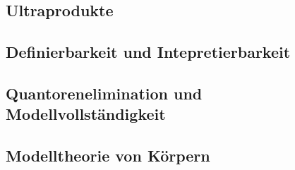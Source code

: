 \subsection{Ultraprodukte}

\subsection{Definierbarkeit und Intepretierbarkeit}

\subsection{Quantorenelimination und Modellvollständigkeit}

\subsection{Modelltheorie von Körpern}